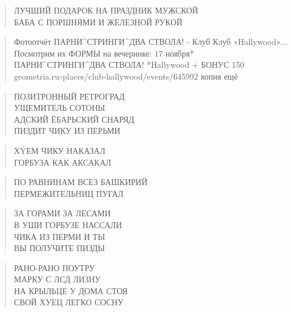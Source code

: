 \poemtitle{***}
\begin{verse}
ЛУЧШИЙ ПОДАРОК НА ПРАЗДНИК МУЖСКОЙ\\
БАБА С ПОРШНЯМИ И ЖЕЛЕЗНОЙ РУКОЙ
\end{verse}

\poemtitle{***}
\begin{verse}
Фотоотчёт ПАРНИ^СТРИНГИ^ДВА СТВОЛА! - Клуб Клуб «Hallywood»...\\
Посмотрим их ФОРМЫ на вечеринке: 17 ноября* ПАРНИ^СТРИНГИ^ДВА СТВОЛА! *Hallywood + БОНУС 150%
geometria.ru›places/club-hallywood/events/645992 копия ещё
\end{verse}

\poemtitle{***}
\begin{verse}
ПОЗИТРОННЫЙ РЕТРОГРАД\\
УЩЕМИТЕЛЬ СОТОНЫ\\
АДСКИЙ ЁБАРЬСКИЙ СНАРЯД\\
ПИЗДИТ ЧИКУ ИЗ ПЕРЬМИ
\end{verse}

\poemtitle{***}
\begin{verse}
ХÝЕМ ЧИКУ НАКАЗАЛ\\
ГОРБУЗА КАК АКСАКАЛ
\end{verse}

\poemtitle{***}
\begin{verse}
ПО РАВНИНАМ ВСЕЗ БАШКИРИЙ\\
ПЕРМЕЖИТЕЛЬНИЦ ПУГАЛ
\end{verse}

\poemtitle{***}
\begin{verse}
ЗА ГОРАМИ ЗА ЛЕСАМИ\\
В УШИ ГОРБУЗЕ НАССАЛИ\\
ЧИКА ИЗ ПЕРМИ И ТЫ\\
ВЫ ПОЛУЧИТЕ ПИЗДЫ
\end{verse}

\poemtitle{***}
\begin{verse}
РАНО-РАНО ПОУТРУ\\
МАРКУ С ЛСД ЛИЗНУ\\
НА КРЫЛЬЦЕ У ДОМА СТОЯ\\
СВОЙ ХУЕЦ ЛЕГКО СОСНУ
\end{verse}


